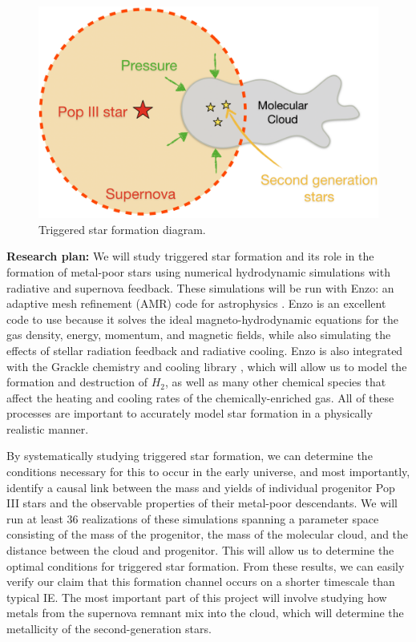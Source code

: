 \documentclass[letterpaper, 12pt]{article}
\begin{document}

\begin{figure}
  \includegraphics[width=\textwidth]{figures/tsf2}
  \caption{Triggered star formation diagram.}
  \label{fig:tsf}
\end{figure}

\textbf{Research plan:} We will study triggered star formation and its role in the formation of metal-poor stars using numerical hydrodynamic simulations with radiative and supernova feedback. These simulations will be run with Enzo: an adaptive mesh refinement (AMR) code for astrophysics \citep{Bryan2014}. Enzo is an excellent code to use because it solves the ideal magneto-hydrodynamic equations for the gas density, energy, momentum, and magnetic fields, while also simulating the effects of stellar radiation feedback and radiative cooling. Enzo is also integrated with the Grackle chemistry and cooling library \citep{Smith2017}, which will allow us to model the formation and destruction of $H_2$, as well as many other chemical species that affect the heating and cooling rates of the chemically-enriched gas. All of these processes are important to accurately model star formation in a physically realistic manner. 

By systematically studying triggered star formation, we can determine the conditions necessary for this to occur in the early universe, and most importantly, identify a causal link between the mass and yields of individual progenitor Pop III stars and the observable properties of their metal-poor descendants. We will run at least 36 realizations of these simulations spanning a parameter space consisting of the mass of the progenitor, the mass of the molecular cloud, and the distance between the cloud and progenitor. This will allow us to determine the optimal conditions for triggered star formation. From these results, we can easily verify our claim that this formation channel occurs on a shorter timescale than typical IE. The most important part of this project will involve studying how metals from the supernova remnant mix into the cloud, which will determine the metallicity of the second-generation stars.
\end{document}
